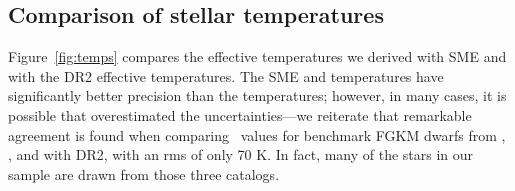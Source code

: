 



%

\subsection{Comparison of stellar temperatures} \label{sec:teffcomparison}

Figure~\ref{fig:temps} compares the effective temperatures we derived with SME and \moog with the \gaia DR2 effective temperatures. 
The SME and \moog temperatures have significantly better precision than the \gaia temperatures; 
however, in many cases, it is possible that \citet{DR2prop} overestimated the uncertainties---we reiterate that 
remarkable agreement is found when comparing \teff\ values for benchmark FGKM dwarfs from 
\citet{Brewer2016}, \citet{boyajian2012}, and \citet{Mann2015} with DR2,  with an rms of only 70 K.
In fact, many of the stars in our sample are drawn from those three catalogs.


